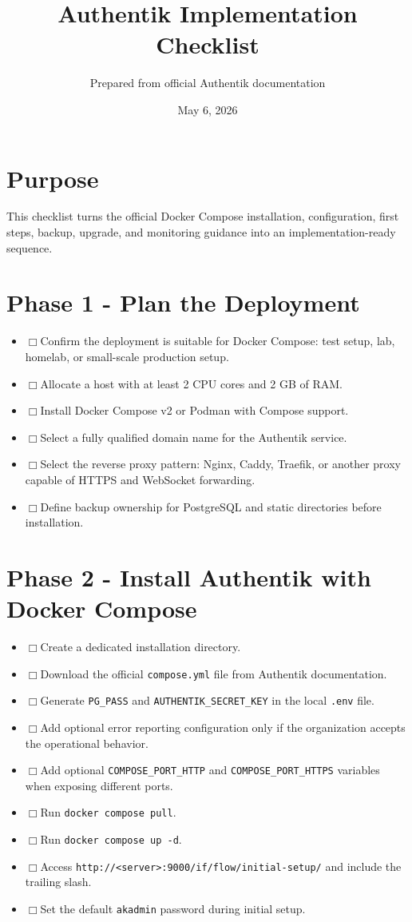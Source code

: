 \documentclass[11pt]{article}
\title{Authentik Implementation Checklist}\author{Prepared from official Authentik documentation}\date{May 6, 2026}
\newcommand{\checkbox}{$\Box$\hspace{0.4em}}
\begin{document}
\maketitle

\section*{Purpose}
This checklist turns the official Docker Compose installation, configuration, first steps, backup, upgrade, and monitoring guidance into an implementation-ready sequence.

\section*{Phase 1 - Plan the Deployment}
\begin{itemize}
\item \checkbox Confirm the deployment is suitable for Docker Compose: test setup, lab, homelab, or small-scale production setup.
\item \checkbox Allocate a host with at least 2 CPU cores and 2 GB of RAM.
\item \checkbox Install Docker Compose v2 or Podman with Compose support.
\item \checkbox Select a fully qualified domain name for the Authentik service.
\item \checkbox Select the reverse proxy pattern: Nginx, Caddy, Traefik, or another proxy capable of HTTPS and WebSocket forwarding.
\item \checkbox Define backup ownership for PostgreSQL and static directories before installation.
\end{itemize}

\section*{Phase 2 - Install Authentik with Docker Compose}
\begin{itemize}
\item \checkbox Create a dedicated installation directory.
\item \checkbox Download the official \texttt{compose.yml} file from Authentik documentation.
\item \checkbox Generate \texttt{PG\_PASS} and \texttt{AUTHENTIK\_SECRET\_KEY} in the local \texttt{.env} file.
\item \checkbox Add optional error reporting configuration only if the organization accepts the operational behavior.
\item \checkbox Add optional \texttt{COMPOSE\_PORT\_HTTP} and \texttt{COMPOSE\_PORT\_HTTPS} variables when exposing different ports.
\item \checkbox Run \texttt{docker compose pull}.
\item \checkbox Run \texttt{docker compose up -d}.
\item \checkbox Access \texttt{http://<server>:9000/if/flow/initial-setup/} and include the trailing slash.
\item \checkbox Set the default \texttt{akadmin} password during initial setup.
\end{itemize}
\end{document}
